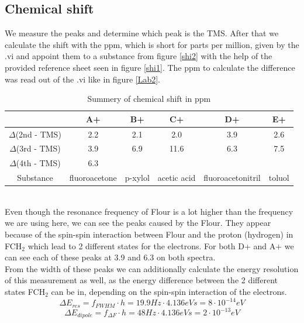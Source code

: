\subsection{Chemical shift}\label{chemical-shift}

We measure the peaks and determine which peak is the TMS. After that we calculate the shift with the ppm, which is short for parts per million, given by the .vi and appoint them to a substance from figure \ref{shi2} with the help of the provided reference sheet seen in figure \ref{shi1}. The ppm to calculate the difference was read out of the .vi like in figure \ref{Lab2}. \\
\begin{table}[h!]
\centering
\begin{tabular}{c||c|c|c|c|c}
 & A+ & B+ & C+ & D+ & E+ \\
\hline
\hline
$\Delta$(2nd - TMS) & 2.2 & 2.1 & 2.0 & 3.9 & 2.6 \\
\hline
$\Delta$(3rd - TMS) & 3.9 & 6.9 & 11.6 & 6.3 & 7.5 \\
\hline
$\Delta$(4th - TMS) & 6.3 &  &  &  & \\
\hline
\hline
Substance & fluoroacetone & p-xylol & acetic acid & fluoroacetonitril & toluol \\
\end{tabular}
\caption{Summery of chemical shift in ppm}
\label{table2}
\end{table}\\
Even though the resonance frequency of Flour is a lot higher than the frequency we are using here, we can see the peaks caused by the Flour. They appear because of the spin-spin interaction between Flour and the proton (hydrogen) in FCH$_2$ which lead to 2 different states for the electrons. For both D+ and A+ we can see each of these peaks at 3.9 and 6.3 on both spectra.
\vspace{2mm}\\
From the width of these peaks we can additionally calculate the energy resolution of this measurement as well, as the energy difference between the 2 different states FCH$_2$ can be in, depending on the spin-spin interaction of the electrons.
\begin{equation}\label{E_r}
	\Delta E_{res} = f_{FWHM} \cdot h = 19.9 Hz \cdot 4.136eVs = 8 \cdot 10^{-14}eV
\end{equation}
\begin{equation}\label{E_d}
	\Delta E_{dipole} = f_{\Delta F} \cdot h = 48 Hz \cdot 4.136eVs = 2 \cdot 10^{-13}eV
\end{equation}\\
